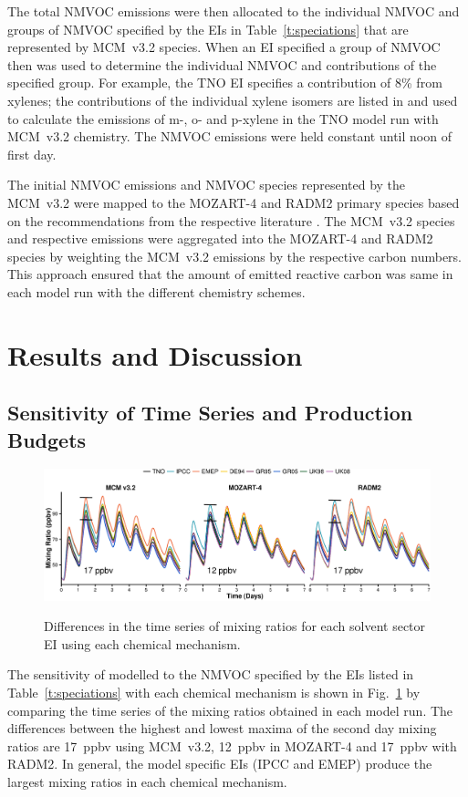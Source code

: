 \documentclass[14pt]{extarticle}
\begin{document}
The total NMVOC emissions were then allocated to the individual NMVOC and groups of NMVOC specified by the EIs in Table~\ref{t:speciations} that are represented by MCM~v3.2 species.
When an EI specified a group of NMVOC then \citet{Passant:2002} was used to determine the individual NMVOC and contributions of the specified group.
For example, the TNO EI specifies a contribution of $8$\% from xylenes; the contributions of the individual xylene isomers are listed in \citet{Passant:2002} and used to calculate the emissions of m-, o- and p-xylene in the TNO model run with MCM~v3.2 chemistry.  
The NMVOC emissions were held constant until noon of first day.

The initial NMVOC emissions and NMVOC species represented by the MCM~v3.2 were mapped to the MOZART-4 and RADM2 primary species based on the recommendations from the respective literature \citep{Emmons:2010, Stockwell:1990}.
The MCM~v3.2 species and respective emissions were aggregated into the MOZART-4 and RADM2 species by weighting the MCM~v3.2 emissions by the respective carbon numbers.
This approach ensured that the amount of emitted reactive carbon was same in each model run with the different chemistry schemes.

\section{Results and Discussion}

\subsection[Sensitivity of O3 Time Series and Ox Production Budgets]{Sensitivity of  Time Series and  Production Budgets} \label{ss:o3}
\begin{figure}
    \centering
    \caption{Differences in the time series of  mixing ratios for each solvent sector EI using each chemical mechanism.}
    \includegraphics[width=\textwidth]{Pictures/Solvents_Only_O3_mixing_ratios}
    \label{f:O3_time_series}
    \vspace{-2mm}
\end{figure}
The sensitivity of modelled  to the NMVOC specified by the EIs listed in Table~\ref{t:speciations} with each chemical mechanism is shown in Fig.~\ref{f:O3_time_series} by comparing the time series of the  mixing ratios obtained in each model run.
The differences between the highest and lowest maxima of the second day  mixing ratios are 17~ppbv using MCM~v3.2, 12~ppbv in MOZART-4 and 17~ppbv with RADM2.
In general, the model specific EIs (IPCC and EMEP) produce the largest  mixing ratios in each chemical mechanism.
\end{document}
